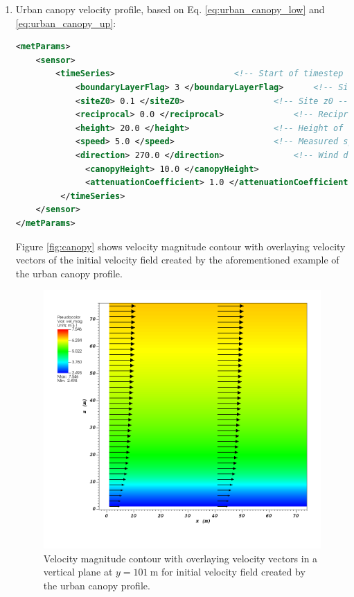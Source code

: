 \begin{enumerate}
\item Urban canopy velocity profile, based on Eq. \ref{eq:urban_canopy_low} and \ref{eq:urban_canopy_up}:

\begin{lstlisting}[language=XML]
<metParams>
	<sensor>
	    <timeSeries>						<!-- Start of timestep informastion for a sensor -->
       		<boundaryLayerFlag> 3 </boundaryLayerFlag> 		<!-- Site boundary layer flag (1-log (default), 2-exp, 3-urban canopy, 4-data entry) -->
       		<siteZ0> 0.1 </siteZ0> 					<!-- Site z0 -->
       		<reciprocal> 0.0 </reciprocal> 				<!-- Reciprocal Monin-Obukhov Length (1/m) -->
       		<height> 20.0 </height> 				<!-- Height of the sensor -->
       		<speed> 5.0 </speed> 					<!-- Measured speed at the sensor height -->
       		<direction> 270.0 </direction> 				<!-- Wind direction of sensor -->
		      <canopyHeight> 10.0 </canopyHeight>
		      <attenuationCoefficient> 1.0 </attenuationCoefficient>
    	 </timeSeries>
	</sensor>
</metParams>
\end{lstlisting}

Figure \ref{fig:canopy} shows velocity magnitude contour with overlaying  velocity vectors of the initial velocity field created by the aforementioned example of the urban canopy profile.

\begin{figure}[H]
\includegraphics[width=\textwidth,keepaspectratio]{Images/canopy_y_101.png}
\caption{Velocity magnitude contour with overlaying velocity vectors in a vertical plane at $y=101\ \si{\meter}$ for initial velocity field created by the urban canopy profile.}
\end{figure}
\noindent


\end{enumerate}
